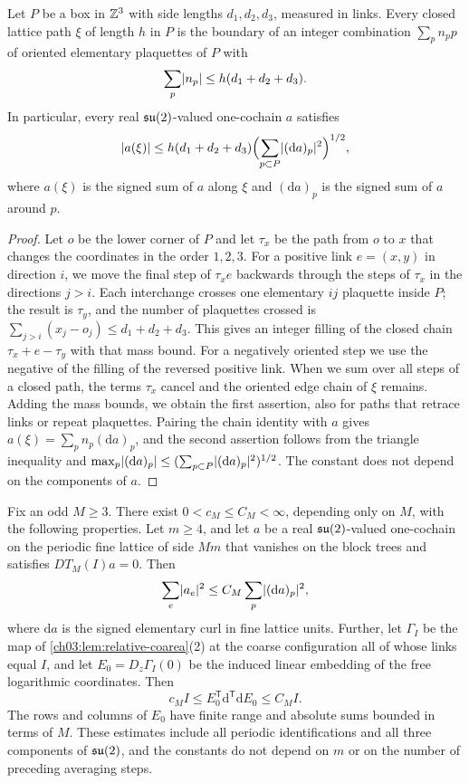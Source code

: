 \begin{lemma}\label{ch03:lem:box-filling}
Let $P$ be a box in $\mathbb Z^3$ with side lengths $d_1,d_2,d_3$, measured in links. Every closed lattice path $\xi$ of length $h$ in $P$ is the boundary of an integer combination $\sum_pn_pp$ of oriented elementary plaquettes of $P$ with
\[
 \sum_p\lvert n_p\rvert\le h(d_1+d_2+d_3).
\]
In particular, every real $\mathfrak{su}(2)$-valued one-cochain $a$ satisfies
\[
 \lvert a(\xi)\rvert\le h(d_1+d_2+d_3)\Bigl(\sum_{p\subset P}\lvert (\mathrm da)_p\rvert^2\Bigr)^{1/2},
\]
where $a(\xi)$ is the signed sum of $a$ along $\xi$ and $(\mathrm da)_p$ is the signed sum of $a$ around $p$.
\end{lemma}

\begin{proof}
Let $o$ be the lower corner of $P$ and let $\tau_x$ be the path from $o$ to $x$ that changes the coordinates in the order $1,2,3$. For a positive link $e=(x,y)$ in direction $i$, we move the final step of $\tau_xe$ backwards through the steps of $\tau_x$ in the directions $j>i$. Each interchange crosses one elementary $ij$ plaquette inside $P$; the result is $\tau_y$, and the number of plaquettes crossed is $\sum_{j>i}(x_j-o_j)\le d_1+d_2+d_3$. This gives an integer filling of the closed chain $\tau_x+e-\tau_y$ with that mass bound. For a negatively oriented step we use the negative of the filling of the reversed positive link. When we sum over all steps of a closed path, the terms $\tau_x$ cancel and the oriented edge chain of $\xi$ remains. Adding the mass bounds, we obtain the first assertion, also for paths that retrace links or repeat plaquettes. Pairing the chain identity with $a$ gives $a(\xi)=\sum_pn_p(\mathrm da)_p$, and the second assertion follows from the triangle inequality and $\max_p\lvert (\mathrm da)_p\rvert\le(\sum_{p\subset P}\lvert (\mathrm da)_p\rvert^2)^{1/2}$. The constant does not depend on the components of $a$.
\end{proof}

\begin{lemma}\label{ch03:lem:free-curl-gap}
Fix an odd $M\ge3$. There exist $0<c_M\le C_M<\infty$, depending only on $M$, with the following properties. Let $m\ge4$, and let $a$ be a real $\mathfrak{su}(2)$-valued one-cochain on the periodic fine lattice of side $Mm$ that vanishes on the block trees and satisfies $DT_M(I)a=0$. Then
\[
 \sum_e\lvert a_e\rvert^2\le C_M\sum_p\lvert (\mathrm da)_p\rvert^2,
\]
where $\mathrm da$ is the signed elementary curl in fine lattice units. Further, let $\Gamma_I$ be the map of \cref{ch03:lem:relative-coarea}(2) at the coarse configuration all of whose links equal $I$, and let $E_0=D_z\Gamma_I(0)$ be the induced linear embedding of the free logarithmic coordinates. Then
\[
 c_MI\le E_0^{\mathsf T}\mathrm d^{\mathsf T}\mathrm dE_0\le C_MI.
\]
The rows and columns of $E_0$ have finite range and absolute sums bounded in terms of $M$. These estimates include all periodic identifications and all three components of $\mathfrak{su}(2)$, and the constants do not depend on $m$ or on the number of preceding averaging steps.
\end{lemma}

